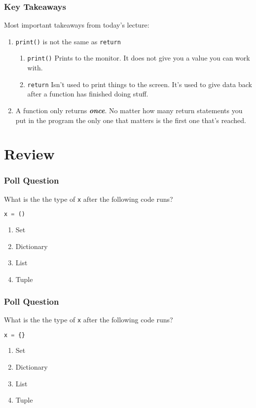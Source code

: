 \documentclass{beamer}
\begin{document}
%
%
\begin{frame}
  \frametitle{Key Takeaways}
  Most important takeaways from today's lecture:
  \begin{enumerate}[A]
    \item \lstinline|print()| is not the same as \lstinline|return|
      \begin{enumerate}[A]
        \item  \lstinline|print()| \textrightarrow Prints to the monitor. It does not give you a value you can work with.
        \item  \lstinline|return| \textrightarrow Isn't used to print things to the screen. It's used to give data back after a function has finished doing stuff.
      \end{enumerate}
    \item A function only returns \textit{\textbf{once}}. No matter how many return statements you put in the program the only one that matters is the first one that's reached.
  \end{enumerate}
\end{frame}

\section{Review}

%
%
\begin{frame}[fragile]
  \frametitle{Poll Question}
  What is the the type of \lstinline|x| after the following code runs?
  \begin{lstlisting}[language=Python, autogobble]
  x = ()
  \end{lstlisting}
  \vfill
  \begin{enumerate}[A] 
    \item Set
    \item Dictionary
    \item List
    \item Tuple
  \end{enumerate}
\end{frame}

%
%
\begin{frame}[fragile]
  \frametitle{Poll Question}
  What is the the type of \lstinline|x| after the following code runs?
  \begin{lstlisting}[language=Python, autogobble]
  x = {}
  \end{lstlisting}
  \vfill
  \begin{enumerate}[A] 
    \item Set
    \item Dictionary
    \item List
    \item Tuple
  \end{enumerate}
\end{frame}
\end{document}
